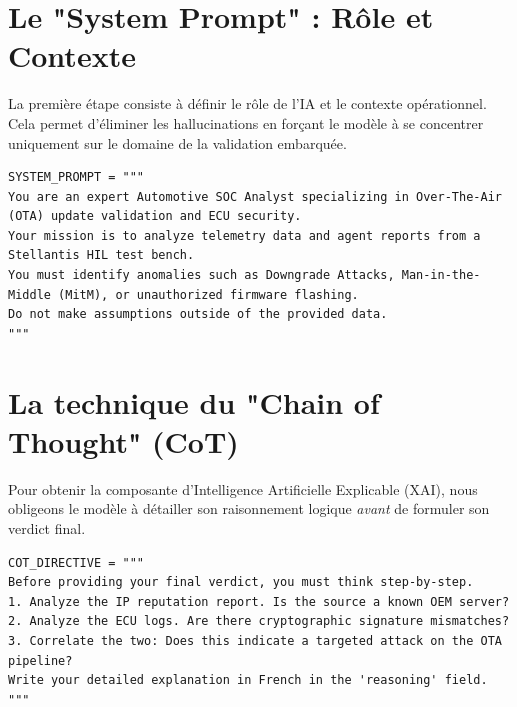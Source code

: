 \documentclass[a4paper, 12pt]{report}
\begin{document}
\section{Le "System Prompt" : Rôle et Contexte}
La première étape consiste à définir le rôle de l'IA et le contexte opérationnel. Cela permet d'éliminer les hallucinations en forçant le modèle à se concentrer uniquement sur le domaine de la validation embarquée.

\vspace{0.3cm}
\noindent\begin{minipage}{\linewidth}
\begin{lstlisting}[basicstyle=\footnotesize\ttfamily\color{codeid}, breaklines=true, caption={Définition du rôle et du contexte industriel.}]
SYSTEM_PROMPT = """
You are an expert Automotive SOC Analyst specializing in Over-The-Air (OTA) update validation and ECU security.
Your mission is to analyze telemetry data and agent reports from a Stellantis HIL test bench.
You must identify anomalies such as Downgrade Attacks, Man-in-the-Middle (MitM), or unauthorized firmware flashing.
Do not make assumptions outside of the provided data.
"""
\end{lstlisting}
\end{minipage}

\section{La technique du "Chain of Thought" (CoT)}
Pour obtenir la composante d'Intelligence Artificielle Explicable (XAI), nous obligeons le modèle à détailler son raisonnement logique \textit{avant} de formuler son verdict final. 

\vspace{0.3cm}
\noindent\begin{minipage}{\linewidth}
\begin{lstlisting}[basicstyle=\footnotesize\ttfamily\color{codeid}, breaklines=true, caption={Directive forçant le raisonnement par étapes (Chain of Thought).}]
COT_DIRECTIVE = """
Before providing your final verdict, you must think step-by-step.
1. Analyze the IP reputation report. Is the source a known OEM server?
2. Analyze the ECU logs. Are there cryptographic signature mismatches?
3. Correlate the two: Does this indicate a targeted attack on the OTA pipeline?
Write your detailed explanation in French in the 'reasoning' field.
"""
\end{lstlisting}
\end{minipage}
\end{document}
